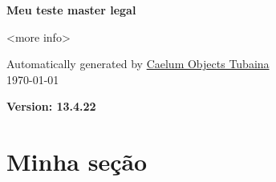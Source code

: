 \documentclass[a4paper, 11pt, oneside]{book}
\begin{document}


\normalfont

\thispagestyle{empty}

\thispagestyle{empty}

\vspace*{2.5cm}
\large \centerline{\bf Meu teste master legal}

\large
\vspace {1.3 cm}
\centerline{\bf <Any other info you might want to show>}

\normalsize
\vspace{2 cm}
\centerline{<more info>}
\vspace{0.1cm}
\vspace {0.3 cm}

\vspace{2.5cm}

\normalsize
\vspace {0.5 cm}
\begin{center}

Automatically generated by \href{http://sourceforge.net/projects/tubaina/}{Caelum Objects Tubaina} \\
\today

\end{center}

\newpage

\newpage
\pagestyle{plain}
\setcounter{page}{1} 

\tableofcontents

\centerline{\bf Version: 13.4.22}

\newpage

\newsavebox{\logotubaina}
\pagestyle{fancy}
\fancyhf{}


\makeatletter
\renewcommand{\chaptermark}[1]{\markboth{\@chapapp\ \thechapter\ -\ #1}{}}
\makeatother
\renewcommand{\sectionmark}[1]{\markright{\ #1}{}}



\setcounter{page}{1}


\section{Minha seção}			
\end{document}
